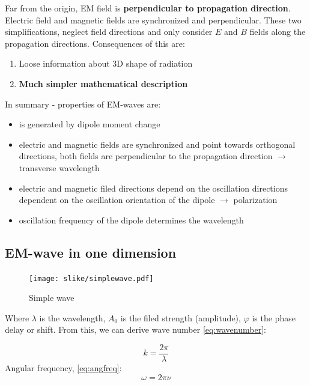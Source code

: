 Far from the origin, EM field is \textbf{perpendicular to propagation direction}.
Electric field and magnetic fields are synchronized and perpendicular. These two simplifications,
neglect field directions and only consider $E$ and $B$ fields along the propagation directions.
Consequences of this are:
\begin{enumerate}
    \item Loose information about 3D shape of radiation
    \item \textbf{Much simpler mathematical description}
\end{enumerate}



In summary - properties of EM-waves are:
\begin{itemize}
    \item is generated by dipole moment change
    \item electric and magnetic fields are synchronized and point towards orthogonal directions, both fields are perpendicular to the propagation direction $\rightarrow$ transverse wavelength
    \item electric and magnetic filed directions depend on the oscillation directions dependent on the oscillation orientation of the dipole $\rightarrow$ polarization
    \item oscillation frequency of the dipole determines the wavelength
\end{itemize}


\subsection{EM-wave in one dimension}
\begin{figure}[h!]
    \centering
    \texttt{[image: slike/simplewave.pdf]}
    \caption{Simple wave}
    \label{fig:simplewave}
\end{figure}

Where $\lambda$ is the wavelength, $A_0$ is the filed strength (amplitude), $\varphi$ is the phase delay or shift. 
From this, we can derive  wave number \ref{eq:wavenumber}:

\begin{equation}
    k = \frac{2 \pi}{\lambda}
    \label{eq:wavenumber}
\end{equation}
Angular frequency, \ref{eq:angfreq}:
\begin{equation}
    \omega = 2 \pi \nu
    \label{eq:angfreq}
\end{equation}

